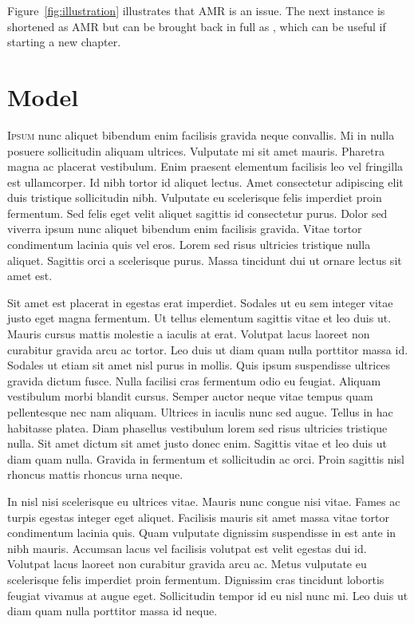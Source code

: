 \documentclass[paper = a4, fontsize = 12pt, numbers = noenddot, DIV = 15, twoside, 
paper = portrait,
listof = totoc,
listof = chapterentry,
egregdoesnotlikesansseriftitles, %
parskip = half %
]{scrbook}
\newcommand{\figref}[1]{Figure~\ref{#1}}
\begin{document}
\figref{fig:illustration} illustrates that \gls{AMR} is an issue. The next instance is shortened as \gls{AMR} but can be brought back in full as , which can be useful if starting a new chapter. 

\clearpage
\chapter{Model}

\lettrine{I}{psum} nunc aliquet bibendum enim facilisis gravida neque convallis. Mi in nulla posuere sollicitudin aliquam ultrices. Vulputate mi sit amet mauris. Pharetra magna ac placerat vestibulum. Enim praesent elementum facilisis leo vel fringilla est ullamcorper. Id nibh tortor id aliquet lectus. Amet consectetur adipiscing elit duis tristique sollicitudin nibh. Vulputate eu scelerisque felis imperdiet proin fermentum. Sed felis eget velit aliquet sagittis id consectetur purus. Dolor sed viverra ipsum nunc aliquet bibendum enim facilisis gravida. Vitae tortor condimentum lacinia quis vel eros. Lorem sed risus ultricies tristique nulla aliquet. Sagittis orci a scelerisque purus. Massa tincidunt dui ut ornare lectus sit amet est.

Sit amet est placerat in egestas erat imperdiet. Sodales ut eu sem integer vitae justo eget magna fermentum. Ut tellus elementum sagittis vitae et leo duis ut. Mauris cursus mattis molestie a iaculis at erat. Volutpat lacus laoreet non curabitur gravida arcu ac tortor. Leo duis ut diam quam nulla porttitor massa id. Sodales ut etiam sit amet nisl purus in mollis. Quis ipsum suspendisse ultrices gravida dictum fusce. Nulla facilisi cras fermentum odio eu feugiat. Aliquam vestibulum morbi blandit cursus. Semper auctor neque vitae tempus quam pellentesque nec nam aliquam. Ultrices in iaculis nunc sed augue. Tellus in hac habitasse platea. Diam phasellus vestibulum lorem sed risus ultricies tristique nulla. Sit amet dictum sit amet justo donec enim. Sagittis vitae et leo duis ut diam quam nulla. Gravida in fermentum et sollicitudin ac orci. Proin sagittis nisl rhoncus mattis rhoncus urna neque.

In nisl nisi scelerisque eu ultrices vitae. Mauris nunc congue nisi vitae. Fames ac turpis egestas integer eget aliquet. Facilisis mauris sit amet massa vitae tortor condimentum lacinia quis. Quam vulputate dignissim suspendisse in est ante in nibh mauris. Accumsan lacus vel facilisis volutpat est velit egestas dui id. Volutpat lacus laoreet non curabitur gravida arcu ac. Metus vulputate eu scelerisque felis imperdiet proin fermentum. Dignissim cras tincidunt lobortis feugiat vivamus at augue eget. Sollicitudin tempor id eu nisl nunc mi. Leo duis ut diam quam nulla porttitor massa id neque.
\end{document}
